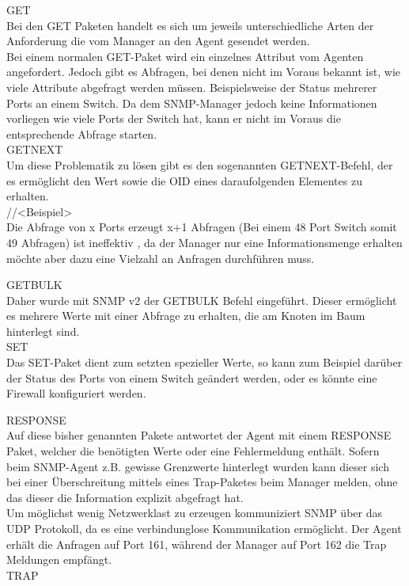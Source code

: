GET\\

Bei den GET Paketen handelt es sich um jeweils unterschiedliche Arten der Anforderung die vom Manager an den Agent gesendet werden.\\
Bei einem normalen GET-Paket wird ein einzelnes Attribut vom Agenten angefordert. Jedoch gibt es Abfragen, bei denen nicht im Voraus bekannt ist, wie viele Attribute abgefragt werden müssen. Beispielsweise der Status mehrerer Ports an einem Switch. Da dem SNMP-Manager jedoch keine Informationen vorliegen wie viele Ports der Switch hat, kann er nicht im Voraus die entsprechende Abfrage starten.\\

GETNEXT\\

Um diese Problematik zu lösen gibt es den sogenannten GETNEXT-Befehl, der es ermöglicht den Wert sowie die OID eines daraufolgenden Elementes zu erhalten.\\
//<Beispiel>\\

Die Abfrage von x Ports erzeugt x+1 Abfragen (Bei einem 48 Port Switch somit 49 Abfragen) ist ineffektiv , da der Manager nur eine Informationsmenge erhalten möchte aber dazu eine Vielzahl an Anfragen durchführen muss.

GETBULK\\
Daher wurde mit SNMP v2 der GETBULK Befehl eingeführt. Dieser ermöglicht es mehrere Werte mit einer Abfrage zu erhalten, die am Knoten im Baum hinterlegt sind.\\

SET\\
Das SET-Paket dient zum setzten spezieller Werte, so kann zum Beispiel darüber der Status des Ports von einem Switch  geändert werden, oder es könnte eine Firewall konfiguriert werden.

RESPONSE\\
Auf diese bisher genannten Pakete antwortet der Agent mit einem RESPONSE Paket, welcher die benötigten Werte oder eine Fehlermeldung enthält.
Sofern beim SNMP-Agent z.B. gewisse Grenzwerte hinterlegt wurden kann dieser sich bei einer Überschreitung mittels eines Trap-Paketes beim Manager melden, ohne das dieser die Information explizit abgefragt hat.\\
Um möglichst wenig Netzwerklast zu erzeugen kommuniziert SNMP über das UDP Protokoll, da es eine verbindunglose Kommunikation ermöglicht. Der Agent erhält die Anfragen auf Port 161, während der Manager auf Port 162 die Trap Meldungen empfängt.\\
TRAP\\





